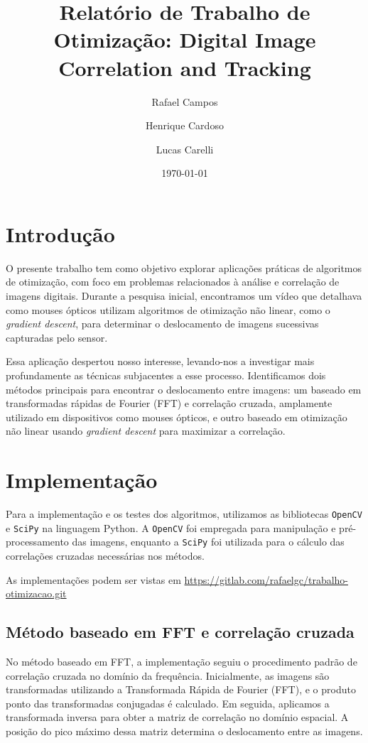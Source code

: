 \documentclass[a4paper,12pt]{article}
\title{Relatório de Trabalho de Otimização: Digital Image Correlation and Tracking}
\author{
    Rafael Campos\\
    \and 
    Henrique Cardoso\\
    \and 
    Lucas Carelli\\
}
\date{\today}
\begin{document}
\maketitle

\tableofcontents

\section{Introdução}

O presente trabalho tem como objetivo explorar aplicações práticas de algoritmos de otimização, com foco em problemas relacionados à análise e correlação de imagens digitais. Durante a pesquisa inicial, encontramos um vídeo que detalhava como mouses ópticos utilizam algoritmos de otimização não linear, como o \textit{gradient descent}, para determinar o deslocamento de imagens sucessivas capturadas pelo sensor.

Essa aplicação despertou nosso interesse, levando-nos a investigar mais profundamente as técnicas subjacentes a esse processo. Identificamos dois métodos principais para encontrar o deslocamento entre imagens: um baseado em transformadas rápidas de Fourier (FFT) e correlação cruzada, amplamente utilizado em dispositivos como mouses ópticos, e outro baseado em otimização não linear usando \textit{gradient descent} para maximizar a correlação.

\section{Implementação}

Para a implementação e os testes dos algoritmos, utilizamos as bibliotecas \texttt{OpenCV} e \texttt{SciPy} na linguagem Python. A \texttt{OpenCV} foi empregada para manipulação e pré-processamento das imagens, enquanto a \texttt{SciPy} foi utilizada para o cálculo das correlações cruzadas necessárias nos métodos.

As implementações podem ser vistas em \url{https://gitlab.com/rafaelgc/trabalho-otimizacao.git}

\subsection{Método baseado em FFT e correlação cruzada}

No método baseado em FFT, a implementação seguiu o procedimento padrão de correlação cruzada no domínio da frequência. Inicialmente, as imagens são transformadas utilizando a Transformada Rápida de Fourier (FFT), e o produto ponto das transformadas conjugadas é calculado. Em seguida, aplicamos a transformada inversa para obter a matriz de correlação no domínio espacial. A posição do pico máximo dessa matriz determina o deslocamento entre as imagens.
\end{document}
